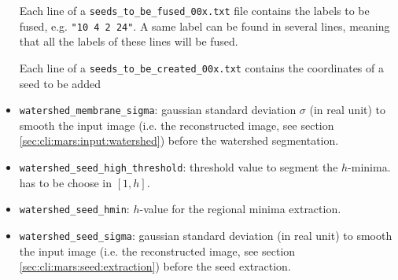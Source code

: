\begin{itemize}
Each line of a \texttt{seeds\_to\_be\_fused\_00x.txt} file contains the labels to be fused, e.g. \texttt{"10 4 2 24"}. A same label can be found in several lines, meaning that all the labels of these lines will be fused.

Each line of a \texttt{seeds\_to\_be\_created\_00x.txt} contains the coordinates of a seed to be added

\item \texttt{watershed\_membrane\_sigma}: gaussian standard deviation $\sigma$ (in real unit) to smooth the input image (i.e. the reconstructed image, see section \ref{sec:cli:mars:input:watershed}) before the watershed segmentation. 
\item \texttt{watershed\_seed\_high\_threshold}: threshold value to segment the $h$-minima. has to be choose in $[1,h]$. 
\item \texttt{watershed\_seed\_hmin}: $h$-value for the regional minima extraction.
\item \texttt{watershed\_seed\_sigma}: gaussian standard deviation (in real unit) to smooth the input image (i.e. the reconstructed image, see section \ref{sec:cli:mars:seed:extraction}) before the seed extraction.
\end{itemize}
